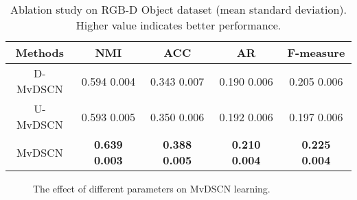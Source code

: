 \documentclass[journal]{IEEEtran}
\begin{document}
\begin{table*}[htbp!]
	\centering
	\caption{Ablation study on RGB-D Object dataset (mean  standard deviation). Higher value indicates better performance.}
	\begin{tabular}{|c|c|c|c|c|}
		\hline
		Methods & NMI & ACC & AR & F-measure\\
		\hline\hline
		D-MvDSCN & 0.594  0.004 & 0.343  0.007 & 0.190  0.006 & 0.205  0.006 \\
		U-MvDSCN & 0.593  0.005 & 0.350  0.006 & 0.192  0.006 & 0.197  0.006 \\
		MvDSCN  & \textbf{0.639  0.003} & \textbf{0.388  0.005} & \textbf{0.210  0.004} & \textbf{0.225  0.004} \\
		\hline
	\end{tabular}
	\label{table:ablation}
\end{table*}

\begin{figure*}[!htbp]
	\centering
	\caption{The effect of different parameters on MvDSCN learning.}
	\label{fig:sen}
\end{figure*}
\end{document}
